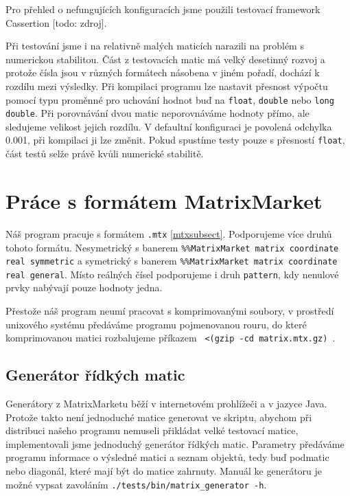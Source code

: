 Pro přehled o nefungujících konfiguracích jsme použili testovací framework Cassertion [todo: zdroj].

Při testování jsme i na relativně malých maticích narazili na problém s numerickou stabilitou. Část z testovacích matic má velký desetinný rozvoj a protože čísla jsou v různých formátech násobena v jiném pořadí, dochází k rozdílu mezi výsledky. Při kompilaci programu lze nastavit přesnost výpočtu pomocí typu proměnné pro uchování hodnot buď na \texttt{float}, \texttt{double} nebo \texttt{long double}. Při porovnávání dvou matic neporovnáváme hodnoty přímo, ale sledujeme velikost jejich rozdílu. V defaultní konfiguraci je povolená odchylka 0.001, při kompilaci ji lze změnit. Pokud spustíme testy  pouze s přesností \texttt{float}, část testů selže právě kvůli numerické stabilitě. 


\section{Práce s formátem MatrixMarket}
\label{MM}

Náš program pracuje s formátem \texttt{.mtx} \ref{mtxsubsect}. Podporujeme více druhů tohoto formátu. Nesymetrický s banerem \texttt{\%\%MatrixMarket matrix coordinate real symmetric} a symetrický s banerem \texttt{\%\%MatrixMarket matrix coordinate real general}. Místo reálných čísel podporujeme i druh \texttt{pattern}, kdy nenulové prvky nabývají pouze hodnoty jedna.

Přestože náš program neumí pracovat s komprimovanými soubory, v prostředí unixového systému předáváme programu pojmenovanou rouru, do které komprimovanou matici rozbalujeme příkazem \texttt{ <(gzip -cd matrix.mtx.gz) }.

\subsection{Generátor řídkých matic}

Generátory z MatrixMarketu běží v internetovém prohlížeči a v jazyce Java. Protože takto není jednoduché matice generovat ve skriptu, abychom při distribuci našeho programu nemuseli přikládat velké testovací matice, implementovali jsme jednoduchý generátor řídkých matic. Parametry předáváme programu informace o výsledné matici a seznam objektů, tedy buď podmatic nebo diagonál, které mají být do matice zahrnuty. Manuál ke generátoru je možné vypsat zavoláním \texttt{./tests/bin/matrix\_generator -h}.    

